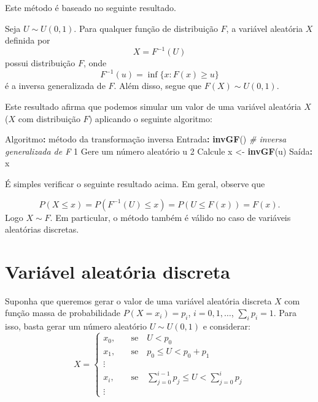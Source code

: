 \documentclass[
]{book}
\newenvironment{Shaded}{\begin{snugshade}}{\end{snugshade}}
\newcommand{\CommentTok}[1]{\textcolor[rgb]{0.56,0.35,0.01}{\textit{#1}}}
\newcommand{\DecValTok}[1]{\textcolor[rgb]{0.00,0.00,0.81}{#1}}
\newcommand{\FunctionTok}[1]{\textcolor[rgb]{0.13,0.29,0.53}{\textbf{#1}}}
\newcommand{\NormalTok}[1]{#1}
\newcommand{\OtherTok}[1]{\textcolor[rgb]{0.56,0.35,0.01}{#1}}
\newcommand{\SpecialCharTok}[1]{\textcolor[rgb]{0.81,0.36,0.00}{\textbf{#1}}}
\begin{document}
Este método é baseado no seguinte resultado.

Seja \(U\sim U(0,1)\). Para qualquer função de distribuição \(F\), a variável aleatória \(X\) definida por \[X = F^{-1}(U)\] possui distribuição \(F\), onde \[F^{-1}(u) = \inf\{x: F(x)\geq u\}\] é a inversa generalizada de \(F\). Além disso, segue que \(F(X)\sim U(0,1)\).

Este resultado afirma que podemos simular um valor de uma variável aleatória \(X\) (\(X\) com distribuição \(F\)) aplicando o seguinte algoritmo:

\begin{Shaded}
\begin{Highlighting}[]
\NormalTok{Algoritmo}\SpecialCharTok{:}\NormalTok{ método da transformação inversa}
\NormalTok{Entrada}\SpecialCharTok{:} \FunctionTok{invGF}\NormalTok{() }\CommentTok{\# inversa generalizada de F}
  \DecValTok{1}\NormalTok{ Gere um número aleatório u }
  \DecValTok{2}\NormalTok{ Calcule x }\OtherTok{\textless{}{-}} \FunctionTok{invGF}\NormalTok{(u)}
\NormalTok{Saída}\SpecialCharTok{:}\NormalTok{ x}
\end{Highlighting}
\end{Shaded}

É simples verificar o seguinte resultado acima. Em geral, observe que

\[P(X \leq x) = P(F^{-1}(U) \leq x) = P(U \leq F(x)) = F(x).\] Logo \(X \sim F\). Em particular, o método também é válido no caso de variáveis aleatórias discretas.

\section{Variável aleatória discreta}\label{variuxe1vel-aleatuxf3ria-discreta}

Suponha que queremos gerar o valor de uma variável aleatória discreta
\(X\) com função massa de probabilidade \(P(X = x_{i}) = p_{i}\),
\(i=0,1,\ldots\), \(\sum_{i}p_{i}=1\). Para isso, basta gerar um número
aleatório \(U \sim U(0,1)\) e considerar: \[X = \begin{cases}
x_{0},& \quad \text{se} \quad U<p_{0} \\
x_{1},& \quad \text{se} \quad p_{0}\leq U <p_{0}+p_{1}\\
\vdots& \\
x_{i},& \quad \text{se} \quad \sum_{j=0}^{i-1}p_{j}\leq U < \sum_{j=0}^{i}p_{j} \\
\vdots
\end{cases}\]
\end{document}
